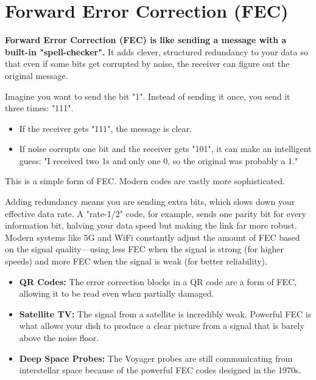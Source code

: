 
\chapter{Forward Error Correction (FEC)}
\label{ch:fec}

\begin{nontechnical}
    \textbf{Forward Error Correction (FEC) is like sending a message with a built-in "spell-checker".} It adds clever, structured redundancy to your data so that even if some bits get corrupted by noise, the receiver can figure out the original message.

    Imagine you want to send the bit "1". Instead of sending it once, you send it three times: "111".
    \begin{itemize}
        \item If the receiver gets "111", the message is clear.
        \item If noise corrupts one bit and the receiver gets "101", it can make an intelligent guess: "I received two 1s and only one 0, so the original was probably a 1."
    \end{itemize}
    This is a simple form of FEC. Modern codes are vastly more sophisticated.

    Adding redundancy means you are sending extra bits, which slows down your effective data rate. A "rate-1/2" code, for example, sends one parity bit for every information bit, halving your data speed but making the link far more robust. Modern systems like 5G and WiFi constantly adjust the amount of FEC based on the signal quality---using less FEC when the signal is strong (for higher speeds) and more FEC when the signal is weak (for better reliability).

    \begin{itemize}
        \item \textbf{QR Codes:} The error correction blocks in a QR code are a form of FEC, allowing it to be read even when partially damaged.
        \item \textbf{Satellite TV:} The signal from a satellite is incredibly weak. Powerful FEC is what allows your dish to produce a clear picture from a signal that is barely above the noise floor.
        \item \textbf{Deep Space Probes:} The Voyager probes are still communicating from interstellar space because of the powerful FEC codes designed in the 1970s.
    \end{itemize}
\end{nontechnical}



